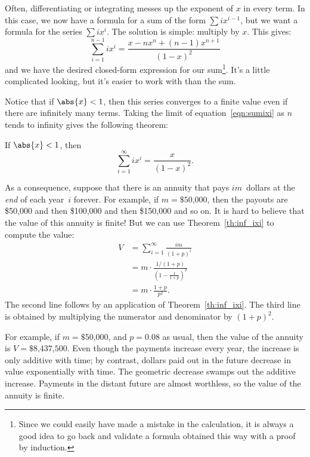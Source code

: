Often, differentiating or integrating messes up the exponent of $x$ in
every term.  In this case, we now have a formula for a sum of the form
$\sum i x^{i-1}$, but we want a formula for the series $\sum i x^i$.
The solution is simple: multiply by $x$.  This gives:
\begin{equation}\label{eqn:sumixi}
    \sum_{i=1}^{n - 1} i x^i = \frac{ x - n x^n + (n - 1) x^{n+1}}{(1 - x)^2}
\end{equation}
and we have the desired closed-form expression for our
sum\footnote{Since we could easily have made a mistake in the
  calculation, it is always a good idea to go back and validate a
  formula obtained this way with a proof by induction.}.  It's a
little complicated looking, but it's easier to work with than the sum.

Notice that if $\abs{x} < 1$, then this series converges to a finite
value even if there are infinitely many terms.  Taking the limit of
equation~\ref{eqn:sumixi} as $n$ tends to infinity gives the following
theorem:
\begin{theorem}\label{th:inf_ixi}
If $\abs{x} < 1$, then
\begin{equation}\label{eqn:inf_ixi}
    \sum_{i=1}^\infty i x^i = \frac{x}{(1-x)^2}.
\end{equation}
\end{theorem}

As a consequence, suppose that there is an annuity that pays
$im$~dollars at the \emph{end} of each year~$i$ forever.  For example,
if $m = \text{\$50,000}$, then the payouts are \$50,000 and then
\$100,000 and then \$150,000 and so on.  It is hard to believe
that the value of this annuity is finite!  But we can use
Theorem~\ref{th:inf_ixi} to compute the value:
\begin{align*}
V & = \sum_{i=1}^\infty \frac{im}{(1+p)^i} \\
  & = m \cdot \frac{1/(1+p)}{(1 - \frac{1}{1+p})^2} \\
  & = m \cdot \frac{1+p}{p^2}.
\end{align*}
The second line follows by an application of Theorem~\ref{th:inf_ixi}.
The third line is obtained by multiplying the numerator and
denominator by $(1+p)^2$.

For example, if $m = \text{\$50,000}$, and $p = 0.08$ as usual, then
the value of the annuity is $V = \text{\$8,437,500}$.  Even though the
payments increase every year, the increase is only additive with time;
by contrast, dollars paid out in the future decrease in value
exponentially with time.  The geometric decrease swamps out the
additive increase.  Payments in the distant future are almost
worthless, so the value of the annuity is finite.

